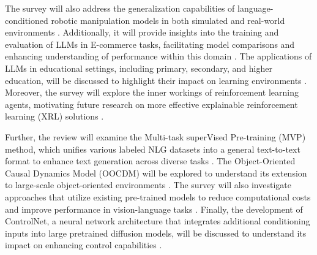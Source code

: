 The survey will also address the generalization capabilities of language-conditioned robotic manipulation models in both simulated and real-world environments \cite{zhou2024languageconditionedimitationlearningbase}. Additionally, it will provide insights into the training and evaluation of LLMs in E-commerce tasks, facilitating model comparisons and enhancing understanding of performance within this domain \cite{li2023ecomgptinstructiontuninglargelanguage}. The applications of LLMs in educational settings, including primary, secondary, and higher education, will be discussed to highlight their impact on learning environments \cite{kasneci2023chatgpt}. Moreover, the survey will explore the inner workings of reinforcement learning agents, motivating future research on more effective explainable reinforcement learning (XRL) solutions \cite{qing2023surveyexplainablereinforcementlearning}.



Further, the review will examine the Multi-task superVised Pre-training (MVP) method, which unifies various labeled NLG datasets into a general text-to-text format to enhance text generation across diverse tasks \cite{tang2023mvpmultitasksupervisedpretraining}. The Object-Oriented Causal Dynamics Model (OOCDM) will be explored to understand its extension to large-scale object-oriented environments \cite{yu2024learningcausaldynamicsmodels}. The survey will also investigate approaches that utilize existing pre-trained models to reduce computational costs and improve performance in vision-language tasks \cite{li2023blip}. Finally, the development of ControlNet, a neural network architecture that integrates additional conditioning inputs into large pretrained diffusion models, will be discussed to understand its impact on enhancing control capabilities \cite{zhang2023adding}.



